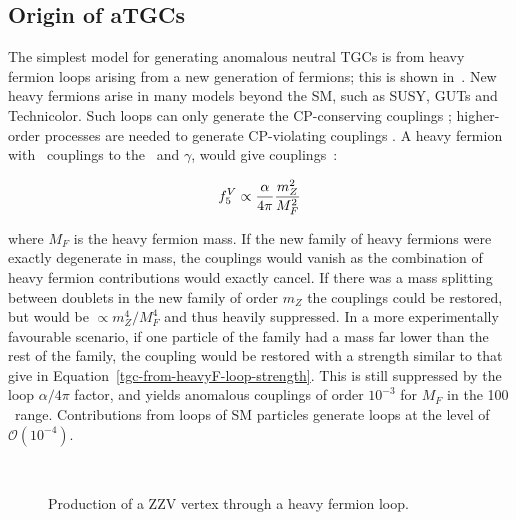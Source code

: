 \subsection{Origin of aTGCs}


The simplest model for generating anomalous neutral TGCs is from heavy fermion
loops arising from a new generation of fermions; this is shown in~. New heavy fermions arise
in many models beyond the SM, such as SUSY, GUTs and Technicolor.
Such
loops can only generate the CP-conserving couplings \ffiveV; higher-order
processes are needed to generate CP-violating couplings \ffourV. A heavy fermion
with \sm\ couplings to the \Z\ and $\gamma$, would give couplings~\cite{Gounaris:2000tb}:

\begin{align}
\ffiveV \propto \frac{\alpha}{4\pi} \frac{m_{Z}^{2}}{M_{F}^{2}}
\label{tgc-from-heavyF-loop-strength}
\end{align}

where $M_{F}$ is the heavy fermion mass. If the new family of heavy fermions
were exactly degenerate in mass, the couplings would vanish as the combination of heavy
fermion contributions would exactly cancel. If there was a mass splitting between doublets in the new family of
order $m_{Z}$ the couplings could be restored, but would be $\propto
m_{Z}^{4} / M_{F}^{4}$ and thus heavily suppressed. In a more
experimentally favourable scenario, if one particle of the family had a mass far
lower than the rest of the family, the coupling would be restored with a
strength similar to that give in Equation~\ref{tgc-from-heavyF-loop-strength}.
This is still suppressed by the loop $\alpha / 4\pi$ factor, and yields
anomalous couplings of order $10^{-3}$ for $M_F$ in the 100 \gev\ range.
Contributions from loops
of SM particles generate loops at the level of $\mathcal{O}(10^{-4})$. 

\begin{figure}
\centering
        \vspace{10mm}
    \mbox{
    }
        \vspace{5mm}
    \caption{Production of a ZZV vertex through a heavy fermion loop. }
    \label{fig:heavy-F-loop}
\end{figure}

